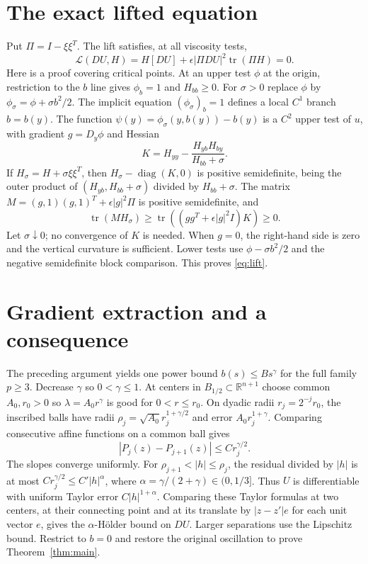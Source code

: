 \documentclass[11pt]{article}
\theoremstyle{remark}\newtheorem{remark}[theorem]{Remark}
\newcommand{\tr}{\operatorname{tr}}
\newcommand{\R}{\mathbb R}
\begin{document}
\section{The exact lifted equation}

Put $\Pi=I-\xi\xi^T$. The lift satisfies, at all viscosity tests,
\begin{equation}\label{eq:lift}
 \mathcal L(DU,H)=H[DU]+\epsilon|\Pi DU|^2\tr(\Pi H)=0.
\end{equation}
Here is a proof covering critical points. At an upper test $\phi$
at the origin, restriction to the $b$ line gives $\phi_b=1$ and
$H_{bb}\geq0$. For $\sigma>0$ replace $\phi$ by
$\phi_\sigma=\phi+\sigma b^2/2$. The implicit equation
$(\phi_\sigma)_b=1$ defines a local $C^1$ branch $b=b(y)$.
The function $\psi(y)=\phi_\sigma(y,b(y))-b(y)$ is a $C^2$ upper
test of $u$, with gradient $g=D_y\phi$ and Hessian
\[
 K=H_{yy}-\frac{H_{yb}H_{by}}{H_{bb}+\sigma}.
\]
If $H_\sigma=H+\sigma\xi\xi^T$, then
$H_\sigma-\operatorname{diag}(K,0)$ is positive semidefinite, being
the outer product of $(H_{yb},H_{bb}+\sigma)$ divided by
$H_{bb}+\sigma$. The matrix
$M=(g,1)(g,1)^T+\epsilon|g|^2\Pi$ is positive semidefinite, and
\[
 \tr(MH_\sigma)\geq\tr((gg^T+\epsilon|g|^2I)K)\geq0.
\]
Let $\sigma\downarrow0$; no convergence of $K$ is needed. When
$g=0$, the right-hand side is zero and the vertical curvature is
sufficient. Lower tests use $\phi-\sigma b^2/2$ and the negative
semidefinite block comparison. This proves \eqref{eq:lift}.




\section{Gradient extraction and a consequence}

The preceding argument yields one power bound $b(s)\leq Bs^\gamma$
for the full family $p\geq3$. Decrease $\gamma$ so $0<\gamma\leq1$.
At centers in $B_{1/2}\subset\R^{n+1}$ choose common $A_0,r_0>0$
so $\lambda=A_0r^\gamma$ is good for $0<r\leq r_0$.
On dyadic radii $r_j=2^{-j}r_0$, the inscribed balls have radii
$\rho_j=\sqrt{A_0}r_j^{1+\gamma/2}$ and error
$A_0r_j^{1+\gamma}$. Comparing consecutive affine functions on a
common ball gives
\[
 |P_j(z)-P_{j+1}(z)|\leq Cr_j^{\gamma/2}.
\]
The slopes converge uniformly. For
$\rho_{j+1}<|h|\leq\rho_j$, the residual divided by $|h|$ is at most
$Cr_j^{\gamma/2}\leq C'|h|^\alpha$, where
$\alpha=\gamma/(2+\gamma)\in(0,1/3]$.
Thus $U$ is differentiable with uniform Taylor error
$C|h|^{1+\alpha}$. Comparing these Taylor formulas at two centers,
at their connecting point and at its translate by $|z-z'|e$ for each
unit vector $e$, gives the $\alpha$-Hölder bound on $DU$. Larger
separations use the Lipschitz bound. Restrict to $b=0$ and restore
the original oscillation to prove Theorem~\ref{thm:main}.
\end{document}
